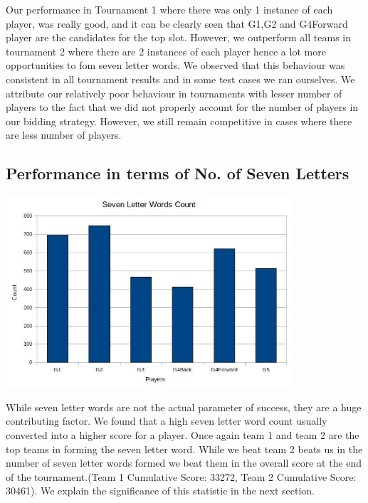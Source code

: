 \documentclass[11pt]{article}
\begin{document}
	Our performance in Tournament 1 where there was only 1 instance of each player, was really good, and it can be clearly seen that G1,G2 and G4Forward player are the candidates for the top slot. However, we outperform all teams in tournament 2 where there are 2 instances of each player hence a lot more opportunities to fom seven letter words. We observed that this behaviour was consistent in all tournament results and in some test cases we ran ourselves. We attribute our relatively poor behaviour in tournaments with lesser number of players to the fact that we did not properly account for the number of players in our bidding strategy. However, we still remain competitive in cases where there are less number of players.
	
	\subsection{Performance in terms of No. of Seven Letters}
	
	\includegraphics[width=0.8\textwidth]{SevenCount}
	
	While seven letter words are not the actual parameter of success, they are a huge contributing factor. We found that a high seven letter word count usually converted into a higher score for a player. Once again team 1 and team 2 are the top teams in forming the seven letter word. While we beat team 2 beats us in the number of seven letter words formed we beat them in the overall score at the end of the tournament.(Team 1 Cumulative Score: 33272, Team 2 Cumulative Score: 30461). We explain the significance of this statistic in the next section.
	
\end{document}
